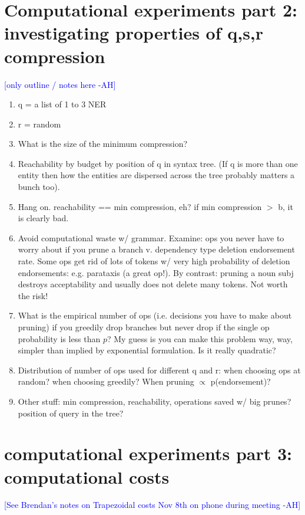 \documentclass[11pt,a4paper]{article}
\newcommand{\ahcomment}[1]{\textcolor{blue}{[#1 -AH]}}
\begin{document}
\section{Computational experiments part 2: investigating properties of q,s,r compression}

\ahcomment{only outline / notes here}

\begin{enumerate}
\item{q = a list of 1 to 3 NER}
\item{r = random}
\item{What is the size of the minimum compression?}
\item{Reachability by budget by position of q in syntax tree. (If q is more than one entity then how the entities are dispersed across the tree probably matters a bunch too).}
\item{Hang on. reachability == min compression, eh? if min compression $>$ b, it is clearly bad.}
\item{Avoid computational waste w/ grammar.  Examine: ops you never have to worry about if you prune a branch v. dependency type deletion endorsement rate. Some ops get rid of lots of tokens w/ very high probability of deletion endorsements: e.g. parataxis (a great op!). By contrast: pruning a noun subj destroys acceptability and usually does not delete many tokens. Not worth the risk!}
\item{What is the empirical number of ops (i.e. decisions you have to make about pruning) if you greedily drop branches but never drop if the single op probability is less than $p$? My guess is you can make this problem way, way, simpler than implied by exponential formulation. Is it really quadratic?}
\item{Distribution of number of ops used for different q and r: when choosing ops at random? when choosing greedily? When pruning $\propto$ p(endorsement)?}
\item{Other stuff: min compression, reachability, operations saved w/ big prunes? position of query in the tree?}
\end{enumerate}

\section{computational experiments part 3: computational costs}

\ahcomment{See Brendan's notes on Trapezoidal costs Nov 8th on phone during meeting}
\end{document}
